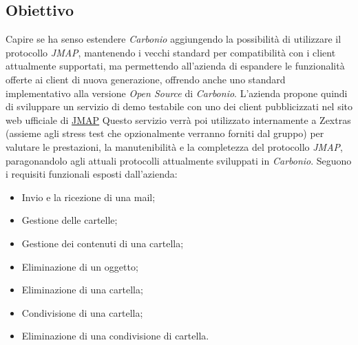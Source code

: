 \documentclass{article}
\begin{document}
\subsection{Obiettivo}
Capire se ha senso estendere \textit{Carbonio} aggiungendo la possibilità di utilizzare il protocollo \textit{JMAP}, mantenendo i vecchi standard per compatibilità con i client attualmente supportati, ma permettendo all’azienda di espandere le funzionalità offerte ai client di nuova generazione, offrendo anche uno standard implementativo alla versione \textit{Open Source} di \textit{Carbonio}.
L’azienda propone quindi di sviluppare un servizio di demo testabile con uno dei client pubblicizzati nel sito web ufficiale di \href{https://jmap.io/software.html)}{JMAP}
Questo servizio verrà poi utilizzato internamente a Zextras (assieme agli stress test che opzionalmente verranno forniti dal gruppo) per valutare le prestazioni, la manutenibilità e la completezza del protocollo \textit{JMAP}, paragonandolo agli attuali protocolli attualmente sviluppati in \textit{Carbonio}.
Seguono i requisiti funzionali esposti dall’azienda:
\begin{itemize}
    \item Invio e la ricezione di una mail;
\item Gestione delle cartelle;
\item Gestione dei contenuti di una cartella;
\item Eliminazione di un oggetto;
\item Eliminazione di una cartella;
\item Condivisione di una cartella;
\item Eliminazione di una condivisione di cartella.
\end{itemize}
\end{document}
